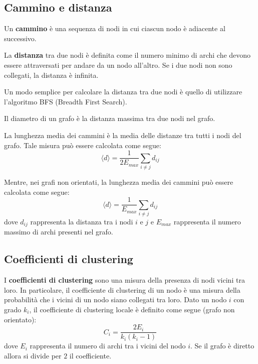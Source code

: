 \subsection{Cammino e distanza}
\begin{definizione}
    Un \textbf{cammino} è una sequenza di nodi in cui ciascun nodo è adiacente
    al successivo.
\end{definizione}
\begin{definizione}
    La \textbf{distanza} tra due nodi è definita come il numero minimo di archi
    che devono essere attraversati per andare da un nodo all'altro. Se i due
    nodi non sono collegati, la distanza è infinita.
\end{definizione}
Un modo semplice per calcolare la distanza tra due nodi è quello di utilizzare
l'algoritmo BFS (Breadth First Search).
\begin{definizione}
    Il diametro di un grafo è la distanza massima tra due nodi nel grafo.
\end{definizione}
\begin{definizione}
    La lunghezza media dei cammini è la media delle distanze tra tutti i nodi
    del grafo. Tale misura può essere calcolata come segue:
    \begin{equation}
        \langle d \rangle = \frac{1}{2E_{max}} \sum_{i \neq j} d_{ij}
    \end{equation}
\end{definizione}
Mentre, nei grafi non orientati, la lunghezza media dei cammini può essere calcolata
come segue:
\begin{equation}
    \langle d \rangle = \frac{1}{E_{max}} \sum_{i \neq j} d_{ij}
\end{equation}
dove $d_{ij}$ rappresenta la distanza tra i nodi $i$ e $j$ e $E_{max}$ rappresenta
il numero massimo di archi presenti nel grafo.
\subsection{Coefficienti di clustering}
\begin{definizione}
    I \textbf{coefficienti di clustering} sono una misura della presenza di nodi
    vicini tra loro. In particolare, il coefficiente di clustering di un nodo è una
    misura della probabilità che i vicini di un nodo siano collegati tra loro.
    Dato un nodo $i$ con grado $k_i$, il coefficiente di clustering locale è
    definito come segue (grafo non orientato):
    \begin{equation}
        C_i = \frac{2E_i}{k_i(k_i - 1)}
    \end{equation}
    dove $E_i$ rappresenta il numero di archi tra i vicini del nodo $i$. Se il grafo
    è diretto allora si divide per $2$ il coefficiente.
\end{definizione}

